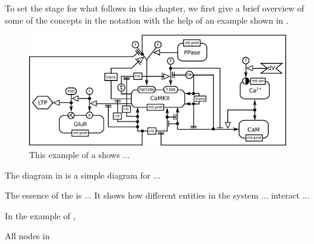 
To set the stage for what follows in this chapter, we first give a brief overview of some of the concepts in the \ER notation with the help of an example shown in .



\begin{figure}[H]
  \centering
  \vspace*{-0.75em}
  \includegraphics[scale=0.8]{examples/CaMKII-intro}
   \caption{This example of a \ER shows ...}
  \label{fig:eg1}
\end{figure}

The diagram in  is a simple diagram for ...
 
The essence of the \ER is ... It shows how different entities in the system ... interact ...  

In the example of , 

All nodes in \ER

% 
% 
% 
% 
% 
% 
% 

